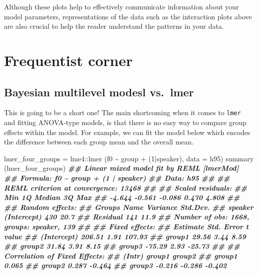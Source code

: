 \documentclass[
]{book}
\newenvironment{Shaded}{\begin{snugshade}}{\end{snugshade}}
\newcommand{\AttributeTok}[1]{\textcolor[rgb]{0.77,0.63,0.00}{#1}}
\newcommand{\DecValTok}[1]{\textcolor[rgb]{0.00,0.00,0.81}{#1}}
\newcommand{\DocumentationTok}[1]{\textcolor[rgb]{0.56,0.35,0.01}{\textbf{\textit{#1}}}}
\newcommand{\FunctionTok}[1]{\textcolor[rgb]{0.00,0.00,0.00}{#1}}
\newcommand{\NormalTok}[1]{#1}
\newcommand{\OtherTok}[1]{\textcolor[rgb]{0.56,0.35,0.01}{#1}}
\newcommand{\SpecialCharTok}[1]{\textcolor[rgb]{0.00,0.00,0.00}{#1}}
\begin{document}
Although these plots help to effectively communicate information about your model parameters, representations of the data such as the interaction plots above are also crucial to help the reader understand the patterns in your data.

\hypertarget{frequentist-corner-2}{%
\section{Frequentist corner}\label{frequentist-corner-2}}

\hypertarget{bayesian-multilevel-modesl-vs.-lmer-2}{%
\subsection{Bayesian multilevel modesl vs.~lmer}\label{bayesian-multilevel-modesl-vs.-lmer-2}}

This is going to be a short one! The main shortcoming when it comes to \texttt{lmer} and fitting ANOVA-type models, is that there is no easy way to compare group effects within the model. For example, we can fit the model below which encodes the difference between each group mean and the overall mean.

\begin{Shaded}
\begin{Highlighting}[]
\NormalTok{lmer\_four\_groups }\OtherTok{=}\NormalTok{ lme4}\SpecialCharTok{::}\FunctionTok{lmer}\NormalTok{ (f0 }\SpecialCharTok{\textasciitilde{}}\NormalTok{ group }\SpecialCharTok{+}\NormalTok{ (}\DecValTok{1}\SpecialCharTok{|}\NormalTok{speaker), }\AttributeTok{data =}\NormalTok{ h95)}
\FunctionTok{summary}\NormalTok{ (lmer\_four\_groups)}
\DocumentationTok{\#\# Linear mixed model fit by REML [\textquotesingle{}lmerMod\textquotesingle{}]}
\DocumentationTok{\#\# Formula: f0 \textasciitilde{} group + (1 | speaker)}
\DocumentationTok{\#\#    Data: h95}
\DocumentationTok{\#\# }
\DocumentationTok{\#\# REML criterion at convergence: 13468}
\DocumentationTok{\#\# }
\DocumentationTok{\#\# Scaled residuals: }
\DocumentationTok{\#\#    Min     1Q Median     3Q    Max }
\DocumentationTok{\#\# {-}4.644 {-}0.561 {-}0.086  0.470  4.808 }
\DocumentationTok{\#\# }
\DocumentationTok{\#\# Random effects:}
\DocumentationTok{\#\#  Groups   Name        Variance Std.Dev.}
\DocumentationTok{\#\#  speaker  (Intercept) 430      20.7    }
\DocumentationTok{\#\#  Residual             141      11.9    }
\DocumentationTok{\#\# Number of obs: 1668, groups:  speaker, 139}
\DocumentationTok{\#\# }
\DocumentationTok{\#\# Fixed effects:}
\DocumentationTok{\#\#             Estimate Std. Error t value}
\DocumentationTok{\#\# (Intercept)   206.51       1.91  107.93}
\DocumentationTok{\#\# group1         29.56       3.44    8.59}
\DocumentationTok{\#\# group2         31.84       3.91    8.15}
\DocumentationTok{\#\# group3        {-}75.29       2.93  {-}25.73}
\DocumentationTok{\#\# }
\DocumentationTok{\#\# Correlation of Fixed Effects:}
\DocumentationTok{\#\#        (Intr) group1 group2}
\DocumentationTok{\#\# group1  0.065              }
\DocumentationTok{\#\# group2  0.287 {-}0.464       }
\DocumentationTok{\#\# group3 {-}0.216 {-}0.286 {-}0.402}
\end{Highlighting}
\end{Shaded}
\end{document}
